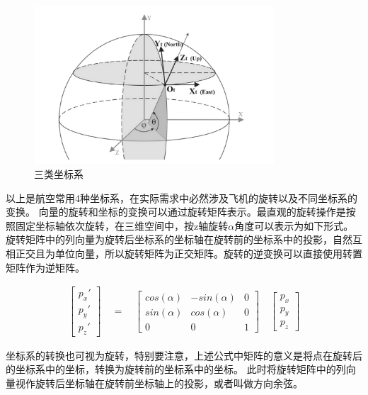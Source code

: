 \begin{itemize}
\begin{figure}[h!]
        \begin{center}
            \includegraphics[width=0.8\textwidth]{pictures/coord.png}
            \caption{三类坐标系}
            \label{crood2}
        \end{center}
    \end{figure}
\end{itemize}
\par
以上是航空常用4种坐标系，在实际需求中必然涉及飞机的旋转以及不同坐标系的变换。
向量的旋转和坐标的变换可以通过旋转矩阵表示\cite{rotate1}。最直观的旋转操作是按照固定坐标轴依次旋转，在三维空间中，按z轴旋转$\alpha$角度可以表示为如下形式。
旋转矩阵中的列向量为旋转后坐标系的坐标轴在旋转前的坐标系中的投影，自然互相正交且为单位向量，所以旋转矩阵为正交矩阵。旋转的逆变换可以直接使用转置矩阵作为逆矩阵。

\begin{equation} 
    \begin{gathered}
        \begin{bmatrix} p_x' \\ p_y' \\ p_z'\end{bmatrix} 
        \quad 
        =
        \quad
        \begin{bmatrix} 
            cos(\alpha) & -sin(\alpha) & 0 \\
            sin(\alpha) & cos(\alpha) & 0 \\ 
            0 & 0 & 1
        \end{bmatrix}
        \quad
        \begin{bmatrix} p_x\\ p_y \\ p_z \end{bmatrix}
    \end{gathered}\nonumber
\end{equation}
\clearpage
\par
坐标系的转换也可视为旋转，特别要注意，上述公式中矩阵的意义是将点在旋转后的坐标系中的坐标，转换为旋转前的坐标系中的坐标。
此时将旋转矩阵中的列向量视作旋转后坐标轴在旋转前坐标轴上的投影，或者叫做方向余弦。

